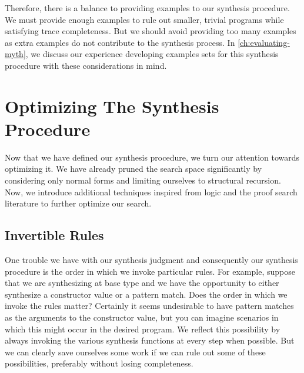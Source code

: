 Therefore, there is a balance to providing examples to our synthesis procedure.
We must provide enough examples to rule out smaller, trivial programs while satisfying trace completeness.
But we should avoid providing too many examples as extra examples do not contribute to the synthesis process.
In \autoref{ch:evaluating-myth}, we discuss our experience developing examples sets for this synthesis procedure with these considerations in mind.

\section{Optimizing The Synthesis Procedure}
\label{sec:optimizing-the-synthesis-procedure}

Now that we have defined our synthesis procedure, we turn our attention towards optimizing it.
We have already pruned the search space significantly by considering only normal forms and limiting ourselves to structural recursion.
Now, we introduce additional techniques inspired from logic and the proof search literature to further optimize our search.

\subsection{Invertible Rules}
\label{subsec:invertible-rules}

One trouble we have with our synthesis judgment and consequently our synthesis procedure is the order in which we invoke particular rules.
For example, suppose that we are synthesizing at base type and we have the opportunity to either synthesize a constructor value or a pattern match.
Does the order in which we invoke the rules matter?
Certainly it seems undesirable to have pattern matches as the arguments to the constructor value, but you can imagine scenarios in which this might occur in the desired program.
We reflect this possibility by always invoking the various synthesis functions at every step when possible.
But we can clearly save ourselves some work if we can rule out some of these possibilities, preferably without losing completeness.

